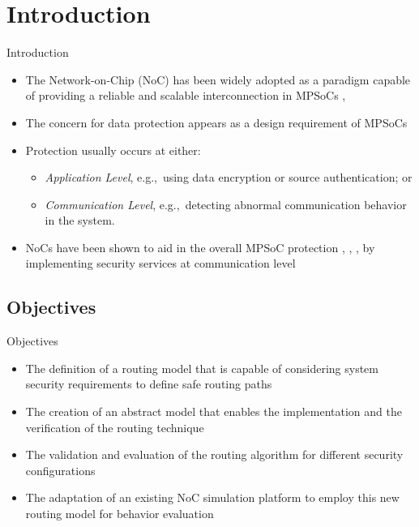 \section{Introduction}\label{sec:intro}
\begin{frame}[allowframebreaks]{Introduction}
	\begin{itemize}
		\setlength{\itemsep}{0.5em}
		\item<1-> The Network-on-Chip (NoC) has been widely adopted as a paradigm capable of providing a reliable and scalable interconnection in MPSoCs \cite{sgroi_addressing_2001}, \cite{ye_packetization_2004}
		
		\item<1-> The concern for data protection appears as a design requirement of MPSoCs
		
		\item<1-> Protection usually occurs at either:
			\begin{itemize}
				\setlength{\itemsep}{0.5em}
				\item<1-> \emph{Application Level}, e.g.,\ using data encryption or source authentication; or
				\item<1-> \emph{Communication Level}, e.g.,\ detecting abnormal communication behavior in the system.
			\end{itemize}
		
		\item<1-> NoCs have been shown to aid in the overall MPSoC protection \cite{diguet_noc-centric_2007}, \cite{sepulveda_noc-based_2015}, \cite{grammatikakis_security_2014}, by implementing security services at communication level
	\end{itemize}
\end{frame}

\subsection{Objectives}\label{sec:objectives}
\begin{frame}{Objectives}
	\begin{itemize}
		\setlength{\itemsep}{1em}
		\item<1-> The definition of a routing model that is capable of considering system security requirements to define safe routing paths
		
		\item<1-> The creation of an abstract model that enables the implementation and the verification of the routing technique
		
		\item<1-> The validation and evaluation of the routing algorithm for different security configurations
		
		\item<1-> The adaptation of an existing NoC simulation platform to employ this new routing model for behavior evaluation
	\end{itemize}
\end{frame}